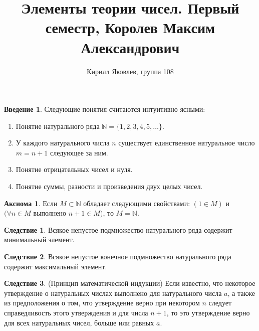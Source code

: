 \documentclass[a4paper, 12pt]{article}
\title{\textbf{Элементы теории чисел. Первый семестр, Королев Максим Александрович}}
\author{Кирилл Яковлев, группа 108}
\theoremstyle{definition}
\newtheorem{consequense}{Следствие}
\newtheorem*{axiom}{Аксиома}
\newtheorem*{introduction}{Введение}
\begin{document}
    \fontsize{14pt}{20pt}\selectfont
    \maketitle
    \newpage
    \tableofcontents
    \fontsize{14pt}{20pt}\selectfont
    \newpage
    \begin{introduction}
        Следующие понятия считаются интуитивно ясными:
    \end{introduction}
    \begin{enumerate}
        \item Понятие натурального ряда $\mathbb{N} = \{1, 2, 3, 4, 5, \dots\}$.
        \item У каждого натурального числа $n$ существует единственное натуральное число $m=n+1$ следующее за ним. 
        \item Понятие отрицательных чисел и нуля.
        \item Понятие суммы, разности и произведения двух целых чисел.
    \end{enumerate}
    \begin{axiom}
        Если $M \subset \mathbb{N}$ обладает следующими свойствами: $(1 \in M)$ и $(\forall n\in M$ выполнено $n+1 \in M)$, то $M = \mathbb{N}$.
    \end{axiom}
    \begin{consequense}
        Всякое непустое подмножество натурального ряда содержит минимальный элемент.
    \end{consequense}
    \begin{consequense}
        Всякое непустое конечное подмножество натурального ряда содержит максимальный элемент.
    \end{consequense}
    \begin{consequense} (Принцип математической индукции)\newline
        Если известно, что некоторое утверждение о натуральных числах выполнено для натурального числа $a$, а также из предположения о том, что утверждение верно при некотором $n$ следует справедливость этого утверждения и для числа $n+1$, то это утверждение верно для всех натуральных чисел, больше или равных $a$.
    \end{consequense}
\end{document}
